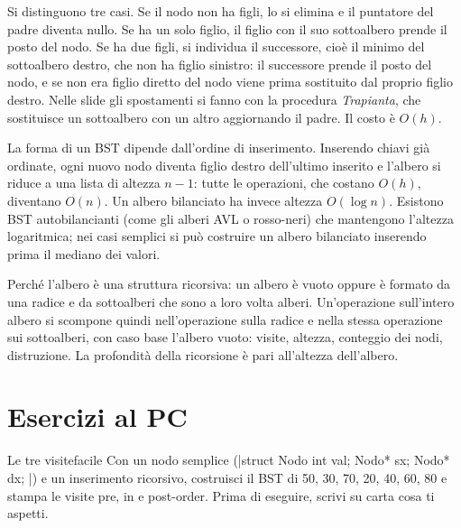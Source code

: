 \begin{orale}
Si distinguono tre casi. Se il nodo non ha figli, lo si elimina e il puntatore del padre
diventa nullo. Se ha un solo figlio, il figlio con il suo sottoalbero prende il posto del
nodo. Se ha due figli, si individua il successore, cioè il minimo del sottoalbero destro,
che non ha figlio sinistro: il successore prende il posto del nodo, e se non era figlio
diretto del nodo viene prima sostituito dal proprio figlio destro. Nelle slide gli
spostamenti si fanno con la procedura \emph{Trapianta}, che sostituisce un sottoalbero con
un altro aggiornando il padre. Il costo è $O(h)$.
\end{orale}

\begin{orale}
La forma di un BST dipende dall'ordine di inserimento. Inserendo chiavi già ordinate, ogni
nuovo nodo diventa figlio destro dell'ultimo inserito e l'albero si riduce a una lista di
altezza $n - 1$: tutte le operazioni, che costano $O(h)$, diventano $O(n)$. Un albero
bilanciato ha invece altezza $O(\log n)$. Esistono BST autobilancianti (come gli alberi
AVL o rosso-neri) che mantengono l'altezza logaritmica; nei casi semplici si può
costruire un albero bilanciato inserendo prima il mediano dei valori.
\end{orale}

\begin{orale}
Perché l'albero è una struttura ricorsiva: un albero è vuoto oppure è formato da una radice
e da sottoalberi che sono a loro volta alberi. Un'operazione sull'intero albero si
scompone quindi nell'operazione sulla radice e nella stessa operazione sui sottoalberi, con
caso base l'albero vuoto: visite, altezza, conteggio dei nodi, distruzione. La profondità
della ricorsione è pari all'altezza dell'albero.
\end{orale}

\section{Esercizi al PC}

\begin{esercizio}{Le tre visite}{facile}
Con un nodo semplice (\cc|struct Nodo { int val; Nodo* sx; Nodo* dx; }|) e un inserimento
ricorsivo, costruisci il BST di 50, 30, 70, 20, 40, 60, 80 e stampa le visite pre, in e
post-order. Prima di eseguire, scrivi su carta cosa ti aspetti.
\end{esercizio}

